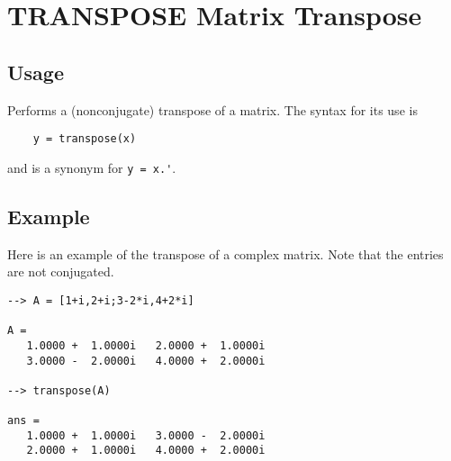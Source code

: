 \section{TRANSPOSE Matrix Transpose}

\subsection{Usage}

Performs a (nonconjugate) transpose of a matrix.  The syntax for
its use is
\begin{verbatim}
    y = transpose(x)
\end{verbatim}
and is a synonym for \verb|y = x.'|.
\subsection{Example}

Here is an example of the transpose of a complex matrix.  Note that
the entries are not conjugated.
\begin{verbatim}
--> A = [1+i,2+i;3-2*i,4+2*i]

A = 
   1.0000 +  1.0000i   2.0000 +  1.0000i 
   3.0000 -  2.0000i   4.0000 +  2.0000i 

--> transpose(A)

ans = 
   1.0000 +  1.0000i   3.0000 -  2.0000i 
   2.0000 +  1.0000i   4.0000 +  2.0000i 
\end{verbatim}
